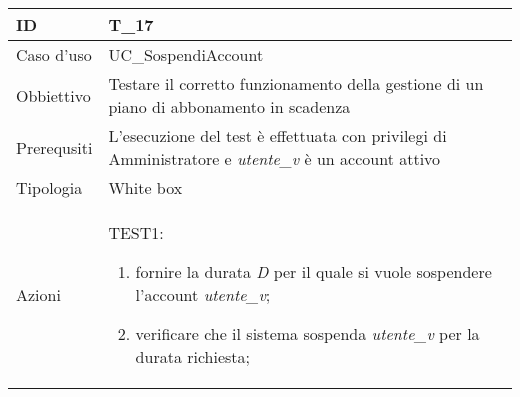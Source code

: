 \begin{table}[hb]
    \centering
    \begin{tabular}{ |p{2cm}|p{10cm}|  }
        \hline
        ID          & T\_17                                                                                                      \\\hline
        Caso d'uso  & UC\_SospendiAccount                                                                                        \\\hline
        Obbiettivo  & Testare il corretto funzionamento della gestione di un piano di abbonamento in scadenza                    \\\hline
        Prerequsiti & L'esecuzione del test è effettuata con privilegi di Amministratore e  \emph{utente\_v} è un account attivo \\\hline
        Tipologia   & White box                                                                                                  \\\hline
        Azioni      &
        TEST1:
        \begin{enumerate}[nosep, topsep=0pt]
            \item fornire la durata \emph{D} per il quale si vuole sospendere l'account \emph{utente\_v};
            \item verificare che il sistema sospenda \emph{utente\_v} per la durata richiesta;
        \end{enumerate}

        \\\hline
    \end{tabular}
\end{table}

